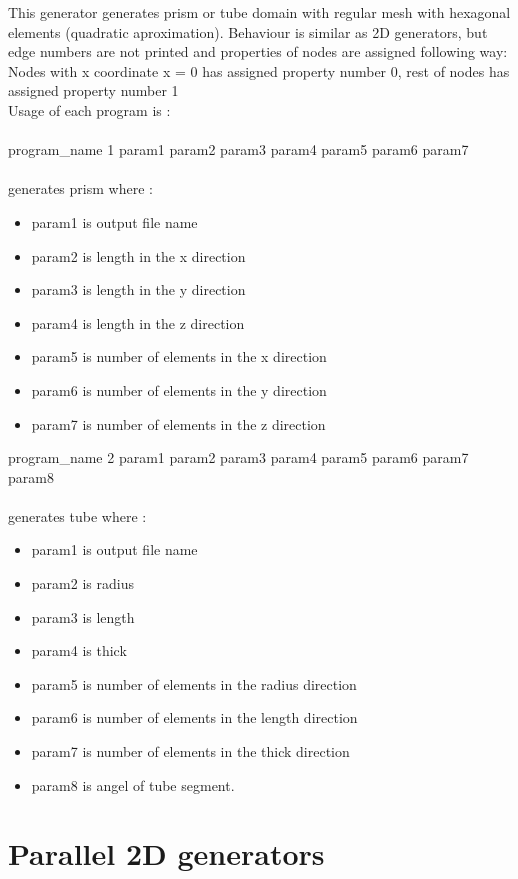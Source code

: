 \documentclass[12pt]{book}
\begin{document}
This generator generates prism or tube domain with regular mesh with hexagonal elements (quadratic aproximation).
Behaviour is similar as 2D generators, but edge numbers are not printed and properties of nodes are
assigned following way:\\
Nodes with x coordinate x = 0 has assigned property number 0, rest of nodes has assigned property number 1\\
Usage of each program is :\\
\\
program\_name 1 param1 param2 param3 param4 param5 param6 param7\\
\\
generates prism where :
\begin{itemize}
\item param1 is output file name
\item param2 is length in the x direction
\item param3 is length in the y direction
\item param4 is length in the z direction
\item param5 is number of elements in the x direction
\item param6 is number of elements in the y direction
\item param7 is number of elements in the z direction
\end{itemize}
program\_name 2 param1 param2 param3 param4 param5 param6 param7 param8\\
\\
generates tube where :
\begin{itemize}
\item param1 is output file name
\item param2 is radius
\item param3 is length
\item param4 is thick
\item param5 is number of elements in the radius direction
\item param6 is number of elements in the length direction
\item param7 is number of elements in the thick direction
\item param8 is angel of tube segment.
\end{itemize}

\section{Parallel 2D generators}
\end{document}
